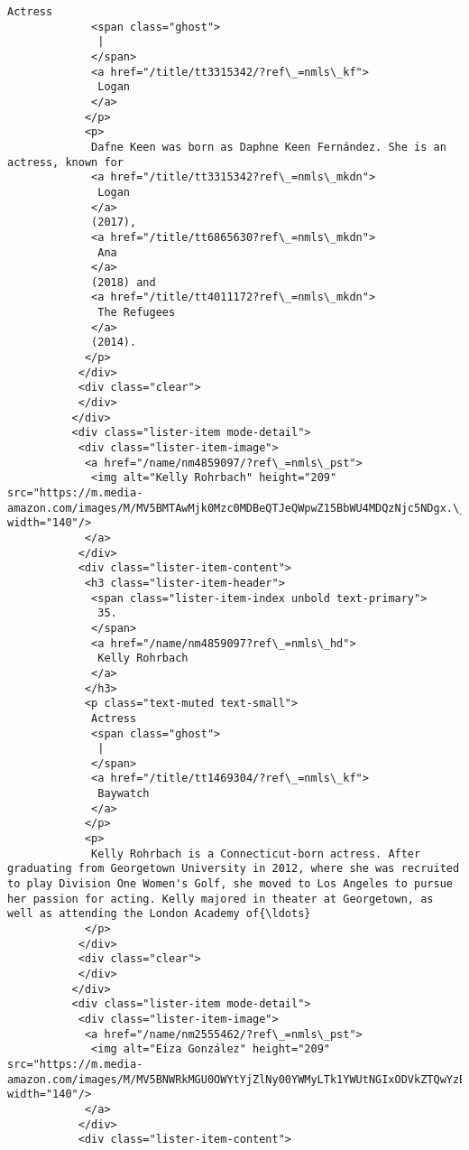 \documentclass[11pt]{article}
\begin{document}
\begin{Verbatim}[commandchars=\\\{\}]
             Actress
             <span class="ghost">
              |
             </span>
             <a href="/title/tt3315342/?ref\_=nmls\_kf">
              Logan
             </a>
            </p>
            <p>
             Dafne Keen was born as Daphne Keen Fernández. She is an actress, known for
             <a href="/title/tt3315342?ref\_=nmls\_mkdn">
              Logan
             </a>
             (2017),
             <a href="/title/tt6865630?ref\_=nmls\_mkdn">
              Ana
             </a>
             (2018) and
             <a href="/title/tt4011172?ref\_=nmls\_mkdn">
              The Refugees
             </a>
             (2014).
            </p>
           </div>
           <div class="clear">
           </div>
          </div>
          <div class="lister-item mode-detail">
           <div class="lister-item-image">
            <a href="/name/nm4859097/?ref\_=nmls\_pst">
             <img alt="Kelly Rohrbach" height="209" src="https://m.media-amazon.com/images/M/MV5BMTAwMjk0Mzc0MDBeQTJeQWpwZ15BbWU4MDQzNjc5NDgx.\_V1\_UX140\_CR0,0,140,209\_AL\_.jpg" width="140"/>
            </a>
           </div>
           <div class="lister-item-content">
            <h3 class="lister-item-header">
             <span class="lister-item-index unbold text-primary">
              35.
             </span>
             <a href="/name/nm4859097?ref\_=nmls\_hd">
              Kelly Rohrbach
             </a>
            </h3>
            <p class="text-muted text-small">
             Actress
             <span class="ghost">
              |
             </span>
             <a href="/title/tt1469304/?ref\_=nmls\_kf">
              Baywatch
             </a>
            </p>
            <p>
             Kelly Rohrbach is a Connecticut-born actress. After graduating from Georgetown University in 2012, where she was recruited to play Division One Women's Golf, she moved to Los Angeles to pursue her passion for acting. Kelly majored in theater at Georgetown, as well as attending the London Academy of{\ldots}
            </p>
           </div>
           <div class="clear">
           </div>
          </div>
          <div class="lister-item mode-detail">
           <div class="lister-item-image">
            <a href="/name/nm2555462/?ref\_=nmls\_pst">
             <img alt="Eiza González" height="209" src="https://m.media-amazon.com/images/M/MV5BNWRkMGU0OWYtYjZlNy00YWMyLTk1YWUtNGIxODVkZTQwYzBjXkEyXkFqcGdeQXVyMjQwMDg0Ng@@.\_V1\_UY209\_CR60,0,140,209\_AL\_.jpg" width="140"/>
            </a>
           </div>
           <div class="lister-item-content">

\end{Verbatim}
\end{document}
